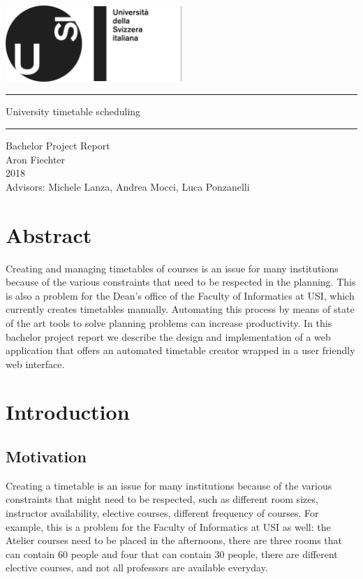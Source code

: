 \documentclass[12pt, a4paper, english]{report}
\begin{document}
\begin{titlepage}
\begin{center}
~\\[2cm]
\includegraphics[width=0.5\textwidth]{logo}\\[3.5cm]
\hrule height 1pt
\vspace{5mm}
{\Huge University timetable scheduling}
\vspace{3mm}
\hrule height 1pt
\vspace{1cm}
{\Large Bachelor Project Report}\\[3mm]
{\Large Aron Fiechter}\\[3mm]
{\Large 2018}\\[3.5cm]
{\large Advisors: Michele Lanza, Andrea Mocci, Luca Ponzanelli}
\end{center}
\end{titlepage}

\tableofcontents
\newpage

\chapter*{Abstract}
Creating and managing timetables of courses is an issue for many institutions because of the various constraints that need to be respected in the planning.
This is also a problem for the Dean's office of the Faculty of Informatics at USI, which currently creates timetables manually.
Automating this process by means of state of the art tools to solve planning problems can increase productivity.
In this bachelor project report we describe the design and implementation of a web application that offers an automated timetable creator wrapped in a user friendly web interface.

\newpage
\chapter{Introduction}
\section{Motivation}
Creating a timetable is an issue for many institutions because of the various constraints that might need to be respected, such as different room sizes, instructor availability, elective courses, different frequency of courses.
For example, this is a problem for the Faculty of Informatics at USI as well: the Atelier courses need to be placed in the afternoons, there are three rooms that can contain 60 people and four that can contain 30 people, there are different elective courses, and not all professors are available everyday.
\end{document}
